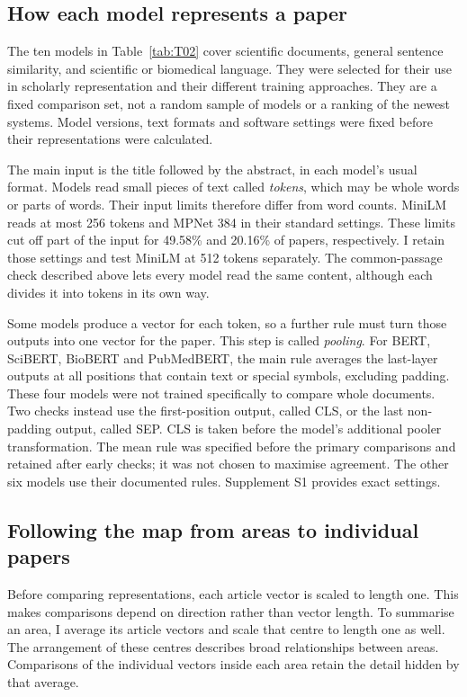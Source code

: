 \documentclass[12pt]{article}
\begin{document}
\subsection{How each model represents a paper}
The ten models in Table~\ref{tab:T02} cover scientific documents, general sentence similarity, and scientific or biomedical language. They were selected for their use in scholarly representation and their different training approaches. They are a fixed comparison set, not a random sample of models or a ranking of the newest systems. Model versions, text formats and software settings were fixed before their representations were calculated.

The main input is the title followed by the abstract, in each model's usual format. Models read small pieces of text called \emph{tokens}, which may be whole words or parts of words. Their input limits therefore differ from word counts. MiniLM reads at most 256 tokens and MPNet 384 in their standard settings. These limits cut off part of the input for 49.58\% and 20.16\% of papers, respectively. I retain those settings and test MiniLM at 512 tokens separately. The common-passage check described above lets every model read the same content, although each divides it into tokens in its own way.

Some models produce a vector for each token, so a further rule must turn those outputs into one vector for the paper. This step is called \emph{pooling}. For BERT, SciBERT, BioBERT and PubMedBERT, the main rule averages the last-layer outputs at all positions that contain text or special symbols, excluding padding. These four models were not trained specifically to compare whole documents. Two checks instead use the first-position output, called CLS, or the last non-padding output, called SEP. CLS is taken before the model's additional pooler transformation. The mean rule was specified before the primary comparisons and retained after early checks; it was not chosen to maximise agreement. The other six models use their documented rules. Supplement S1 provides exact settings.


\subsection{Following the map from areas to individual papers}
Before comparing representations, each article vector is scaled to length one. This makes comparisons depend on direction rather than vector length. To summarise an area, I average its article vectors and scale that centre to length one as well. The arrangement of these centres describes broad relationships between areas. Comparisons of the individual vectors inside each area retain the detail hidden by that average.
\end{document}
